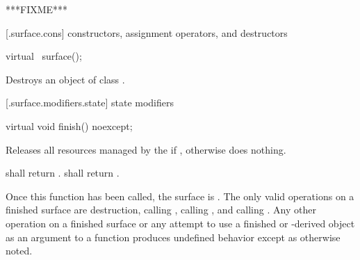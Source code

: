 \pnum
***FIXME***



 [\iotwod.surface.cons] { constructors, assignment operators, and destructors}

\begin{itemdecl}
virtual ~surface();
\end{itemdecl}
\begin{itemdescr}
\pnum
\effects
Destroys an object of class .
\end{itemdescr}

 [\iotwod.surface.modifiers.state] { state modifiers}

\begin{itemdecl}
virtual void finish() noexcept;
\end{itemdecl}
\begin{itemdescr}
\pnum
\effects
Releases all resources managed by the  if , otherwise does nothing.

\pnum
\postconditions
{} shall return .  shall return .

\pnum
\remarks
Once this function has been called, the surface is . The only valid operations on a finished surface are destruction, calling , calling , and calling . Any other operation on a finished surface or any attempt to use a finished  or -derived object as an argument to a function produces undefined behavior except as otherwise noted.
\end{itemdescr}

